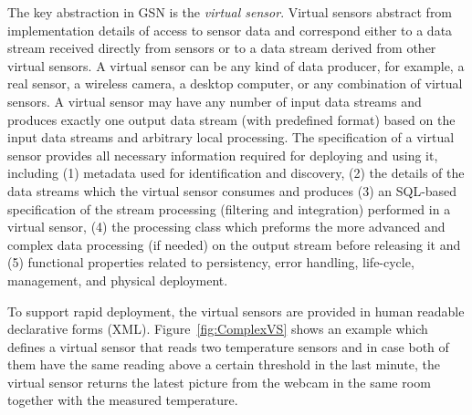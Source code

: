 The key abstraction in GSN is the \textit{virtual sensor}. Virtual
sensors abstract from implementation details of access to sensor data
and correspond either to a data stream received directly from sensors
or to a data stream derived from other virtual sensors. A virtual
sensor can be any kind of data producer, for example, a real sensor, a
wireless camera, a desktop computer, or any combination of virtual sensors.
A virtual sensor may have any number of input data
streams and produces exactly one output data stream (with predefined format) based on the input
data streams and arbitrary local processing. The specification of a
virtual sensor provides all necessary information required for
deploying and using it, including (1) metadata used for identification
and discovery, (2) the details of the data streams which the virtual
sensor consumes and produces (3) an SQL-based specification of the
stream processing (filtering and integration) performed in a virtual sensor, (4)
the processing class which preforms the more advanced and complex data processing (if needed) on the output
stream before releasing it and (5) functional properties related to persistency, error handling, life-cycle,
management, and physical deployment.

To support rapid deployment, the virtual sensors are provided
in human readable declarative forms (XML). Figure~\ref{fig:ComplexVS} shows an
example which defines a virtual sensor that reads two temperature sensors and
in case both of them have the same reading above a certain threshold in the
last minute, the virtual sensor returns the latest picture from the webcam in
the same room together with the measured temperature.


